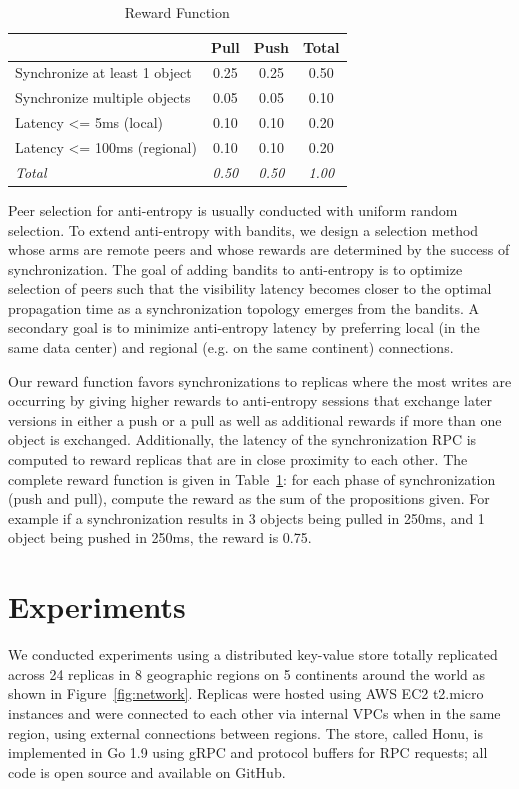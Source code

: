 \begin{table}[]
\centering
\begin{tabular}{@{}l c c c @{}}
\toprule
& \textbf{Pull} & \textbf{Push} & \textbf{Total} \\
\midrule
Synchronize at least 1 object & 0.25 & 0.25 & 0.50 \\
Synchronize multiple objects  & 0.05 & 0.05 & 0.10 \\
Latency <= 5ms (local)        & 0.10 & 0.10 & 0.20 \\
Latency <= 100ms (regional)   & 0.10 & 0.10 & 0.20 \\
\midrule
\textit{Total} & \textit{0.50} & \textit{0.50} & \textit{1.00} \\
\bottomrule
\end{tabular}
\caption{Reward Function}
\label{tab:rewards}
\end{table}

Peer selection for anti-entropy is usually conducted with uniform random
selection.
To extend anti-entropy with bandits, we design a selection method whose arms
are remote peers and whose rewards are determined by the success of
synchronization.
The goal of adding bandits to anti-entropy is to optimize selection of peers
such that the visibility latency becomes closer to the optimal propagation
time as a synchronization topology emerges from the bandits.
A secondary goal is to minimize anti-entropy latency by preferring local (in
the same data center) and regional (e.g. on the same continent) connections.

Our reward function favors synchronizations to replicas where the most writes
are occurring by giving higher rewards to anti-entropy sessions that exchange
later versions in either a push or a pull as well as additional rewards if
more than one object is exchanged.
Additionally, the latency of the synchronization RPC is computed to reward
replicas that are in close proximity to each other.
The complete reward function is given in Table~\ref{tab:rewards}: for each
phase of synchronization (push and pull), compute the reward as the sum of the
propositions given.
For example if a synchronization results in 3 objects being pulled in 250ms,
and 1 object being pushed in 250ms, the reward is 0.75.

\section*{Experiments}

We conducted experiments using a distributed key-value store totally
replicated across 24 replicas in 8 geographic regions on 5 continents
around the world as shown in Figure~\ref{fig:network}.
Replicas were hosted using AWS EC2 t2.micro instances and were connected to
each other via internal VPCs when in the same region, using external
connections between regions.
The store, called Honu, is implemented in Go 1.9 using gRPC and protocol
buffers for RPC requests; all code is open source and available on GitHub.


